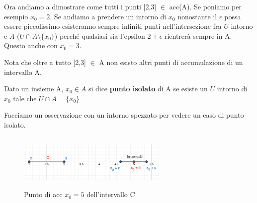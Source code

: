 Ora andiamo a dimostrare come tutti i punti [2,3] $\in$ acc(A).
Se poniamo per esempio $x_0 = 2$. Se andiamo a prendere un intorno di $x_0$ nonostante il $\epsilon$ possa essere piccolissimo esisteranno sempre infiniti punti nell'intersezione fra $U$ intorno e $A$ ($U \cap A \setminus \{x_0\}$) perché qualsiasi sia l'epsilon $2 + \epsilon$ rientrerà sempre in A.\\
Questo anche con $x_0 = 3$. 
\begin{note}
Nota che oltre a tutto [2,3] $\in$ A non esisto altri punti di accumulazione di un intervallo A.
\end{note}

\begin{definition}
    Dato un insieme A, $x_0 \in A$ si dice \textbf{punto isolato} di A se esiste un $U$ intorno di $x_0$ tale che $U \cap A = \{x_0\}$
\end{definition}
\begin{example}
    Facciamo un osservazione con un intorno spezzato per vedere un caso di punto isolato.
\end{example}
\begin{figure}
    \centering
    \includegraphics[width=7.3cm, height=2.7cm]{images/esempio-intorno-sepezzato.png}
    \caption{Punto di acc $x_0 = 5$ dell'intervallo C}
\end{figure}

